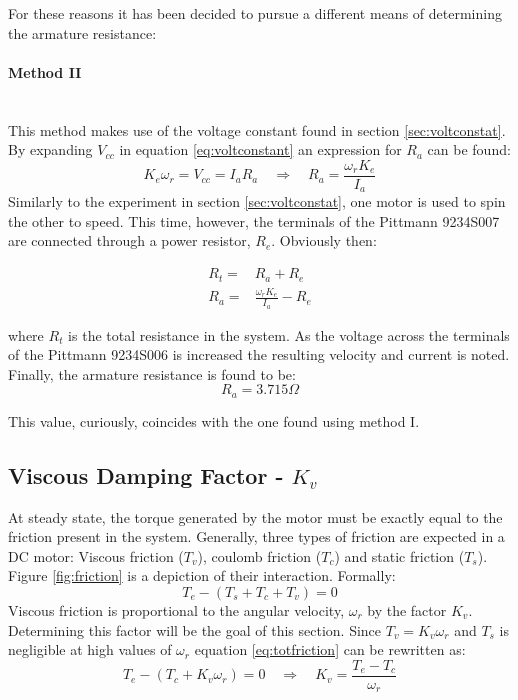 For these reasons it has been decided to pursue a different means of determining the armature resistance:
\paragraph{Method II}~\\
This method makes use of the voltage constant found in section \ref{sec:voltconstat}.
By expanding $V_{cc}$ in equation \ref{eq:voltconstant} an expression for $R_a$ can be found:
\begin{equation}
	\label{eq:voltconstantexpanded}
	K_e\omega_r = V_{cc} = I_aR_a\quad \Rightarrow \quad R_a = \frac{\omega_rK_e}{I_a}
\end{equation}
Similarly to the experiment in section \ref{sec:voltconstat}, one motor is used to spin the other to speed.
This time, however, the terminals of the Pittmann 9234S007 are connected through a power resistor, $R_e$.
Obviously then:

\begin{eqnarray}
	R_t =& R_a + R_e\\
	R_a =& \frac{\omega_rK_e}{I_a}-R_e
\end{eqnarray}

where $R_t$ is the total resistance in the system.
As the voltage across the terminals of the Pittmann 9234S006 is increased the resulting velocity and current is noted.
Finally, the armature resistance is found to be:
$$R_a = 3.715\Omega$$

This value, curiously, coincides with the one found using method I.

\subsection{Viscous Damping Factor - $K_v$}
\label{sec:viscous}
At steady state, the torque generated by the motor must be exactly equal to the friction present in the system.
Generally, three types of friction are expected in a DC motor: Viscous friction ($T_v$), coulomb friction ($T_c$) and static friction ($T_s$).
Figure \ref{fig:friction} is a depiction of their interaction.
Formally:
\begin{equation}
	\label{eq:totfriction}
	T_e-(T_s+T_c+T_v)=0
\end{equation}
Viscous friction is proportional to the angular velocity, $\omega_r$ by the factor $K_v$.
Determining this factor will be the goal of this section.
Since $T_v=K_v\omega_r$ and $T_s$ is negligible at high values of $\omega_r$ equation \ref{eq:totfriction} can be rewritten as:
\begin{equation}
	\label{eq:frictionnostatic}
	T_e-(T_c+K_v\omega_r)=0 \quad \Rightarrow \quad K_v = \frac{T_e-T_c}{\omega_r}
\end{equation}

